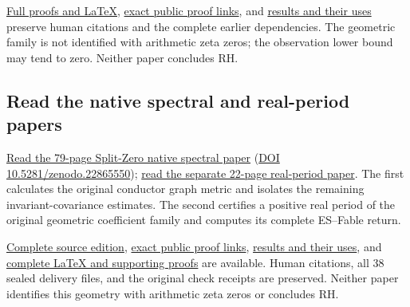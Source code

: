 \documentclass[
]{article}
\begin{document}
\href{https://github.com/KokunoYumeto/zeta-function-research-reader/blob/main/workbenches/splitzero-tandem/continuations/20260921-directional-inverse-power/README.md}{Full
proofs and LaTeX},
\href{https://github.com/KokunoYumeto/zeta-function-research-reader/blob/main/workbenches/splitzero-tandem/continuations/20260921-directional-inverse-power/PROOF_LINKS.json}{exact
public proof links}, and
\href{https://github.com/KokunoYumeto/zeta-function-research-reader/blob/main/workbenches/splitzero-tandem/continuations/20260921-directional-inverse-power/RESULT_INDEX.json}{results
and their uses} preserve human citations and the complete earlier
dependencies. The geometric family is not identified with arithmetic
zeta zeros; the observation lower bound may tend to zero. Neither paper
concludes RH.

\subsection{Read the native spectral and real-period
papers}\label{read-the-native-spectral-and-real-period-papers}

\href{https://zenodo.org/records/22865550}{Read the 79-page Split-Zero
native spectral paper}
(\href{https://doi.org/10.5281/zenodo.22865550}{DOI
10.5281/zenodo.22865550});
\href{https://zenodo.org/records/22865550/files/103-splitzero-real-period.pdf?download=1}{read
the separate 22-page real-period paper}. The first calculates the
original conductor graph metric and isolates the remaining
invariant-covariance estimates. The second certifies a positive real
period of the original geometric coefficient family and computes its
complete ES--Fable return.

\href{https://github.com/KokunoYumeto/zeta-function-research-reader/blob/0fd693c844aad9117e30ec447c59864a28af10f3/workbenches/splitzero-tandem/continuations/20260921-native-spectral-real-pair/README.md}{Complete
source edition},
\href{https://github.com/KokunoYumeto/zeta-function-research-reader/blob/0fd693c844aad9117e30ec447c59864a28af10f3/workbenches/splitzero-tandem/continuations/20260921-native-spectral-real-pair/PROOF_LINKS.json}{exact
public proof links},
\href{https://github.com/KokunoYumeto/zeta-function-research-reader/blob/0fd693c844aad9117e30ec447c59864a28af10f3/workbenches/splitzero-tandem/continuations/20260921-native-spectral-real-pair/RESULT_INDEX.json}{results
and their uses}, and
\href{https://zenodo.org/records/22865550/files/104-splitzero-spectral-real-period-sources.zip?download=1}{complete
LaTeX and supporting proofs} are available. Human citations, all 38
sealed delivery files, and the original check receipts are preserved.
Neither paper identifies this geometry with arithmetic zeta zeros or
concludes RH.
\end{document}

